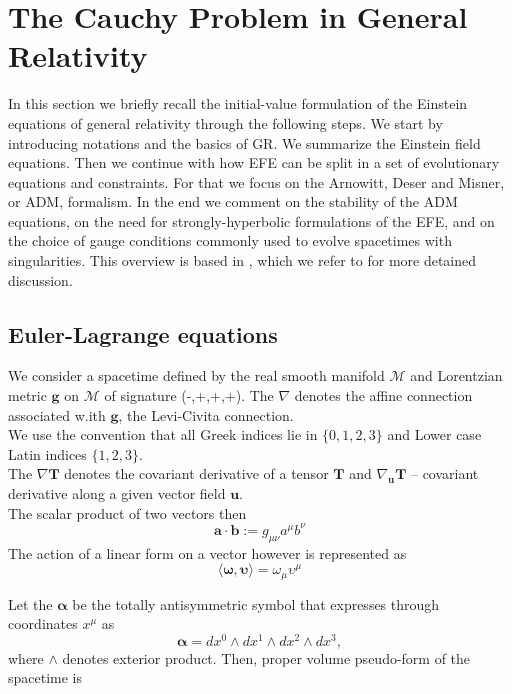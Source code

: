 \documentclass[11pt,a4paper,headinclude=true,DIV=14,BCOR=8mm,chapterprefix,listof=totoc,twoside,openright,abstracton]{scrbook}
\begin{document}
\section{The Cauchy Problem in General Relativity}

In this section we briefly recall the initial-value formulation of the Einstein equations of general relativity through the following steps. We start by introducing notations and the basics of GR. We summarize the Einstein field equations. Then we continue with how EFE can be split in a set of evolutionary equations and constraints. For that we focus on the Arnowitt, Deser and Misner, or ADM, formalism. In the end we comment on the stability of the ADM equations, on the need for strongly-hyperbolic formulations of the EFE, and on the choice of gauge conditions commonly used to
evolve spacetimes with singularities. This overview is based in \cite{Arnowitt:1962hi,Landau:1982dva,Wald:1984,Misner:1973,Baumgarte:2002jm}, which we refer to for more detained discussion.

\subsection{Euler-Lagrange equations}

We consider a spacetime defined by the real smooth manifold $\mathcal{M}$ and Lorentzian metric $\boldsymbol{g}$ on $\mathcal{M}$ of signature (-,+,+,+). The $\nabla$ denotes the affine connection associated w.ith $\boldsymbol{g}$, the Levi-Civita connection. \\
We use the convention that all Greek indices lie in $\{0, 1, 2, 3\}$ and Lower case Latin indices $\{1, 2, 3\}$. \\
The $\nabla\boldsymbol{T}$ denotes the covariant derivative of a tensor $\boldsymbol{T}$ and $\nabla_{\boldsymbol{u}}\boldsymbol{T}$ -- covariant derivative along a given vector field $\boldsymbol{u}$.\\
The scalar product of two vectors then 
\begin{equation}
    \boldsymbol{a}\cdot\boldsymbol{b}:=g_{\mu\nu}a^{\mu}b^{\nu}
\end{equation}
The action of a linear form on a vector however is represented as 
\begin{equation}
    \langle\boldsymbol{\omega},\boldsymbol{\upsilon}\rangle=\omega_{\mu}\upsilon^{\mu}
\end{equation}

Let the $\boldsymbol{\alpha}$ be the totally antisymmetric symbol that expresses through coordinates $x^{\mu}$ as
\begin{equation}
    \boldsymbol{\alpha} = dx^0 \wedge dx^1 \wedge dx^2 \wedge dx^3,
\end{equation}
where $\wedge$ denotes exterior product. Then, proper volume pseudo-form of the spacetime is
\end{document}
